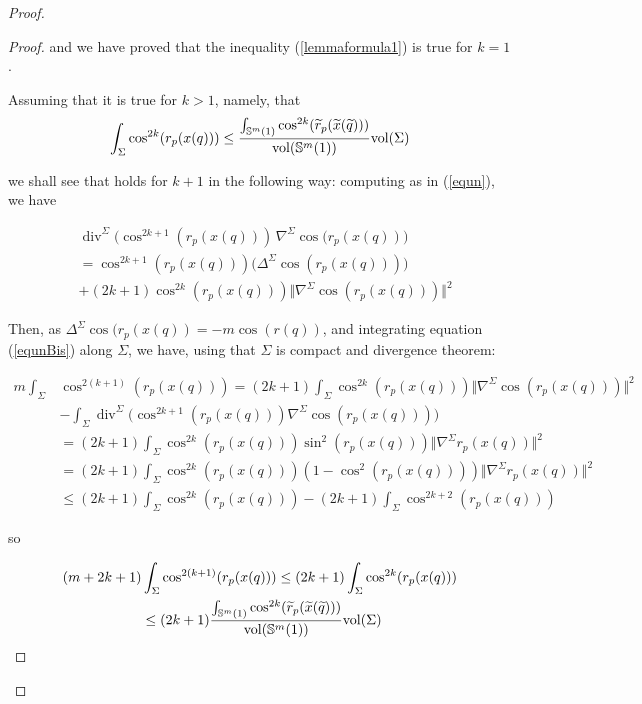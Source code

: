 \documentclass{amsart}
\theoremstyle{definition}
\theoremstyle{remark}
\newcommand{\Div}{\operatorname{div}}
\begin{document}
\begin{proof}
\begin{proof}
and we have proved that the inequality (\ref{lemmaformula1}) is true for $k=1$.

Assuming that it is true for $k >1$, namely, that
\begin{equation}\label{eqsisBis}
\int_\Sigma \cos^{2k}(r_p(x(q))) \leq \frac{\int_{\mathbb{S}^m(1)} \cos^{2k}(\widetilde{r}_p(\widetilde{x}(\widetilde{q})))}{{\rm vol}(\mathbb{S}^m(1))} {\rm vol}(\Sigma)
\end{equation}


\noindent  we shall see that holds for $k+1$ in the following way: computing as in (\ref{equn}), we have 

\begin{equation}\label{equnBis}
\begin{aligned}
&\Div^\Sigma\big(\cos^{2k+1} (r_p(x(q)))\,\nabla^\Sigma \cos(r_p(x(q))\big)\\&=\cos^{2k+1}(r_p(x(q)))\big(\Delta^\Sigma\cos(r_p(x(q)))\big)\\&+(2k+1) \cos^{2k}(r_p(x(q)))\Vert \nabla^\Sigma \cos(r_p(x(q)))\Vert^2
\end{aligned}
\end{equation}

 \noindent Then, as $\Delta^\Sigma \cos(r_p(x(q))=-m\cos(r(q))$, and integrating equation (\ref{equnBis}) along $\Sigma$, we have, using that $\Sigma$ is compact and divergence theorem:

\begin{equation}\label{eqdossBis}
\begin{aligned}
m\int_\Sigma& \cos^{2(k+1)}(r_p(x(q)))=(2k+1)\int_\Sigma\cos^{2k}(r_p(x(q)))\Vert \nabla^{\Sigma}  \cos(r_p(x(q)))\Vert^2\\&-\int_\Sigma \Div^\Sigma\big(\cos^{2k+1}(r_p(x(q)))\nabla^\Sigma \cos(r_p(x(q)))\big)
\\&=(2k+1)\int_\Sigma \cos^{2k}(r_p(x(q)))\sin^2(r_p(x(q)))\Vert \nabla^{\Sigma} r_p(x(q))\Vert^2\\&=(2k+1)\int_\Sigma \cos^{2k}(r_p(x(q)))(1-\cos^2(r_p(x(q))))\Vert \nabla^{\Sigma} r_p(x(q))\Vert^2\\&\leq (2k+1)\int_\Sigma \cos^{2k}(r_p(x(q)))-(2k+1)\int_\Sigma \cos^{2k+2}(r_p(x(q)))
\end{aligned}
\end{equation}

\noindent so

\begin{equation}\label{eqdoss2Bis}
\begin{aligned}
(m+2k+1)&\int_\Sigma \cos^{2(k+1)}(r_p(x(q)))\leq (2k+1)\int_\Sigma \cos^{2k}(r_p(x(q)))\\ & \leq  (2k+1)\frac{\int_{\mathbb{S}^m(1)} \cos^{2k}(\widetilde{r}_p(\widetilde{x}(\widetilde{q})))}{{\rm vol}(\mathbb{S}^m(1))} {\rm vol}(\Sigma)
\end{aligned}
\end{equation}


\end{proof}
\end{proof}
\end{document}
